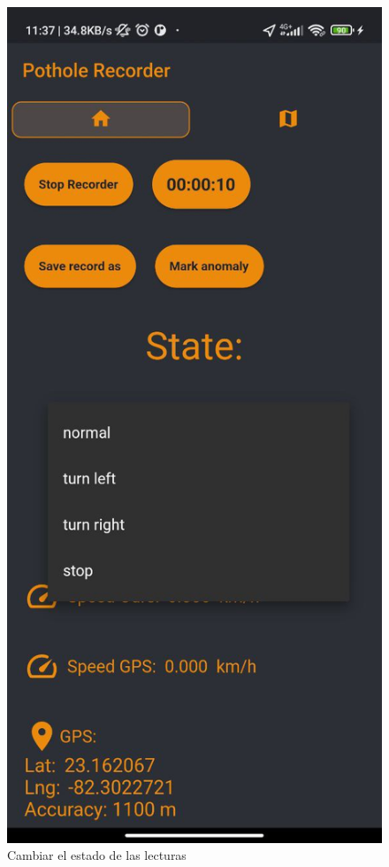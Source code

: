 \begin{figure}[htb]
		\includegraphics[scale = 0.2]{Graphics/apk_change_state_2.jpg}
		\caption{Cambiar el estado de las lecturas}
		\label{fig:9}
	\end{figure}

